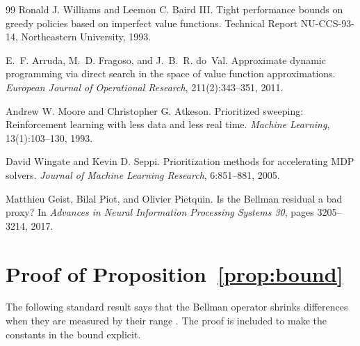 \documentclass{article}
\begin{document}
\begin{thebibliography}{99}
Ronald J. Williams and Leemon C. Baird III.
\newblock Tight performance bounds on greedy policies based on imperfect value
  functions.
\newblock Technical Report NU-CCS-93-14, Northeastern University, 1993.

E.~F. Arruda, M.~D. Fragoso, and J.~B.~R. do~Val.
\newblock Approximate dynamic programming via direct search in the space of
  value function approximations.
\newblock \emph{European Journal of Operational Research}, 211(2):343--351,
  2011.

Andrew W. Moore and Christopher G. Atkeson.
\newblock Prioritized sweeping: Reinforcement learning with less data and less
  real time.
\newblock \emph{Machine Learning}, 13(1):103--130, 1993.

David Wingate and Kevin D. Seppi.
\newblock Prioritization methods for accelerating {MDP} solvers.
\newblock \emph{Journal of Machine Learning Research}, 6:851--881, 2005.

Matthieu Geist, Bilal Piot, and Olivier Pietquin.
\newblock Is the Bellman residual a bad proxy?
\newblock In \emph{Advances in Neural Information Processing Systems 30}, pages
  3205--3214, 2017.

\end{thebibliography}

\clearpage
\appendix

\section{Proof of Proposition~\ref{prop:bound}}
\label{app:proof}

The following standard result says that the Bellman operator shrinks
differences when they are measured by their range \citep[][§6.6]{puterman1994}.
The proof is included to make the constants in the bound explicit.
\end{document}
